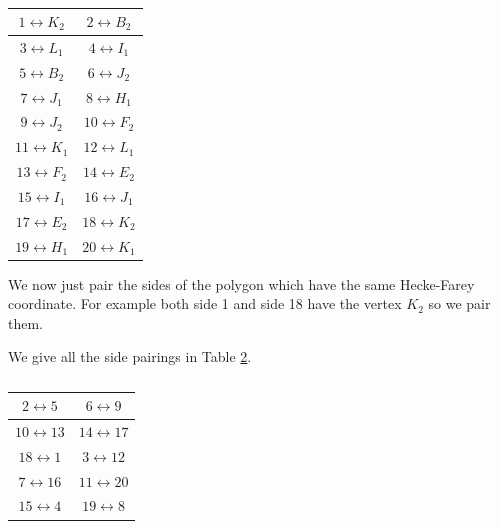\documentclass{amsproc}
\numberwithin{equation}{section}
\numberwithin{equation}{section}
\theoremstyle{definition}
\theoremstyle{remark}
\numberwithin{equation}{section}
\begin{document}
 \begin{table}[h!]   
\begin{center}
\begin{tabular}{ | c | c | } 
\hline
 $1 \leftrightarrow  K_2$ &  $2 \leftrightarrow B_2$   \\ \hline
 $3 \leftrightarrow  L_1$ &  $4 \leftrightarrow I_1$  \\ \hline
 $5 \leftrightarrow  B_2$ &  $6 \leftrightarrow J_2$ \\ \hline
$7 \leftrightarrow  J_1$ &  $8 \leftrightarrow H_1$\\ \hline
$9 \leftrightarrow  J_2$ &  $10 \leftrightarrow F_2$ \\ \hline
$11 \leftrightarrow  K_1$ &  $12 \leftrightarrow L_1$ \\ \hline
$13 \leftrightarrow  F_2$ &  $14 \leftrightarrow E_2$ \\ \hline
$15 \leftrightarrow  I_1$ &  $16 \leftrightarrow J_1$ \\ \hline
$17 \leftrightarrow  E_2$ &  $18 \leftrightarrow K_2$ \\ \hline
$19 \leftrightarrow  H_1$ &  $20 \leftrightarrow K_1$ \\ \hline

\end{tabular}
    \end{center}
    \caption{}
    \label{table:ds}

\end{table}   

 We now just pair the sides of the polygon which have the same Hecke-Farey coordinate.  For example both side 1 and side 18 have the vertex $K_2$ so we pair them.
 
 We give all the side pairings in Table \ref{table:c}.
 \begin{table}[h!]   
\begin{center}
\begin{tabular}{ | c | c | } 
\hline
 $2 \leftrightarrow  5$ &  $6 \leftrightarrow 9$   \\ \hline
 $10 \leftrightarrow  13$ &  $14 \leftrightarrow 17$  \\ \hline
 $18 \leftrightarrow  1$ &  $3 \leftrightarrow 12$ \\ \hline
$7 \leftrightarrow  16$ &  $11 \leftrightarrow 20$\\ \hline
$15 \leftrightarrow  4$ &  $19 \leftrightarrow 8$ \\ \hline

\end{tabular}
    \end{center}
    \caption{}
    \label{table:c}

\end{table}   
\end{document}
